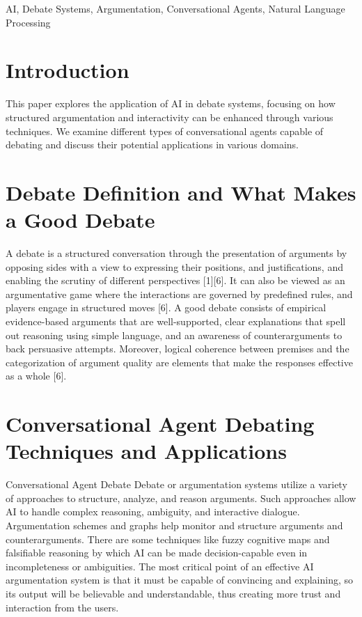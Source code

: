\documentclass[conference]{IEEEtran}
\begin{document}
\begin{IEEEkeywords}
AI, Debate Systems, Argumentation, Conversational Agents, Natural Language Processing
\end{IEEEkeywords}

\section{Introduction}
This paper explores the application of AI in debate systems, focusing on how structured argumentation and interactivity can be enhanced through various techniques. We examine different types of conversational agents capable of debating and discuss their potential applications in various domains.

\section{Debate Definition and What Makes a Good Debate}
A debate is a structured conversation through the presentation of arguments by opposing sides with a view to expressing their positions, and justifications, and enabling the scrutiny of different perspectives [1][6]. It can also be viewed as an argumentative game where the interactions are governed by predefined rules, and players engage in structured moves [6]. A good debate consists of empirical evidence-based arguments that are well-supported, clear explanations that spell out reasoning using simple language, and an awareness of counterarguments to back persuasive attempts. Moreover, logical coherence between premises and the categorization of argument quality are elements that make the responses effective as a whole [6].

\section{Conversational Agent Debating Techniques and Applications}
Conversational Agent Debate Debate or argumentation systems utilize a variety of approaches to structure, analyze, and reason arguments. Such approaches allow AI to handle complex reasoning, ambiguity, and interactive dialogue. Argumentation schemes and graphs help monitor and structure arguments and counterarguments. There are some techniques like fuzzy cognitive maps and falsifiable reasoning by which AI can be made decision-capable even in incompleteness or ambiguities. The most critical point of an effective AI argumentation system is that it must be capable of convincing and explaining, so its output will be believable and understandable, thus creating more trust and interaction from the users.
\end{document}
